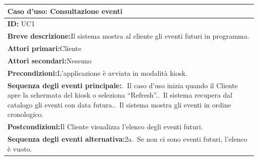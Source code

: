 \begin{center}
\small
\begin{tabular}{|p{}|}
\hline
\textbf{Caso d'uso: Consultazione eventi} \\ \hline
\textbf{ID:} UC1 \\ \hline
\textbf{Breve descrizione:}\newline Il sistema mostra al cliente gli eventi futuri in programma. \\ \hline
\textbf{Attori primari:}\newline Cliente \\ \hline
\textbf{Attori secondari:}\newline Nessuno \\ \hline
\textbf{Precondizioni:}\newline L'applicazione è avviata in modalità kiosk. \\ \hline
\textbf{Sequenza degli eventi principale:}\newline 1.~Il caso d'uso inizia quando il Cliente apre la schermata del kiosk o seleziona ``Refresh''.\newline
2.~Il sistema recupera dal catalogo gli eventi con data futura.\newline
3.~Il sistema mostra gli eventi in ordine cronologico. \\ \hline
\textbf{Postcondizioni:}\newline Il Cliente visualizza l'elenco degli eventi futuri. \\ \hline
\textbf{Sequenza degli eventi alternativa:}\newline 2a.~Se non ci sono eventi futuri, l'elenco è vuoto. \\ \hline
\end{tabular}
\end{center}

